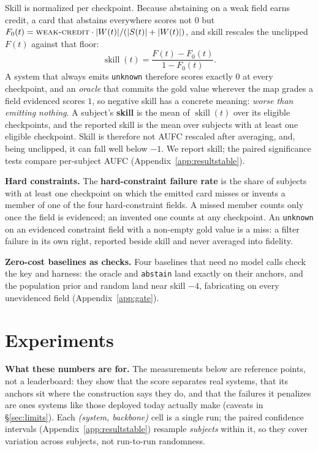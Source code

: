 \documentclass{article}
\begin{document}
Skill is normalized per checkpoint. Because abstaining on a
weak field earns credit, a card that abstains everywhere scores not $0$ but
$F_0(t)=\textsc{weak-credit}\cdot|W(t)|/(|S(t)|+|W(t)|)$, and skill rescales the unclipped $F(t)$
against that floor:
\[
  \operatorname{skill}(t)=\frac{F(t)-F_0(t)}{1-F_0(t)}.
\]
A system that always emits \texttt{unknown} therefore scores exactly $0$ at every checkpoint, and an
\emph{oracle} that commits the gold value wherever the map grades a field evidenced scores $1$, so negative skill has a concrete meaning: \emph{worse
than emitting nothing}. A subject's \textbf{skill} is the mean of $\operatorname{skill}(t)$ over its
eligible checkpoints, and the reported skill is the mean over subjects with at least one eligible
checkpoint. Skill is therefore not AUFC rescaled after averaging, and, being unclipped, it can fall
well below $-1$. We report skill; the paired significance tests compare per-subject AUFC
(Appendix~\ref{app:resultstable}).

\textbf{Hard constraints.} The \textbf{hard-constraint failure rate} is the share of subjects with
at least one checkpoint on which the emitted card misses or invents a member of one of the four
hard-constraint fields. A missed member counts only once the field is evidenced; an invented one
counts at any checkpoint. An \texttt{unknown} on an evidenced constraint field with a non-empty gold
value is a miss: a filter failure in its own right, reported beside skill and never averaged into
fidelity.

\textbf{Zero-cost baselines as checks.} Four baselines that need no model calls check the key and
harness: the oracle and \texttt{abstain} land exactly on their anchors, and the population prior and
random land near skill $-4$, fabricating on every unevidenced field (Appendix~\ref{app:gate}).

\section{Experiments}
\label{sec:results}

\textbf{What these numbers are for.} The measurements below are reference points, not a leaderboard:
they show that the score separates real systems, that its anchors sit where the construction says
they do, and that the failures it penalizes are ones systems like those deployed today actually make
(caveats in \S\ref{sec:limits}). Each \emph{(system, backbone)} cell is a single run; the paired confidence
intervals (Appendix~\ref{app:resultstable}) resample \emph{subjects} within it, so they cover variation across subjects, not
run-to-run randomness.
\end{document}
